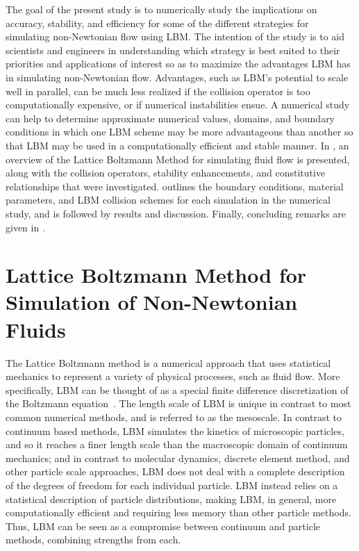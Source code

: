 The goal of the present study is to numerically study the implications on accuracy, stability, and efficiency for some of the different strategies for simulating non-Newtonian flow using LBM. The intention of the study is to aid scientists and engineers in understanding which strategy is best suited to their priorities and applications of interest so as to maximize the advantages LBM has in simulating non-Newtonian flow.
Advantages, such as LBM's potential to scale well in parallel, can be much less realized if the collision operator is too computationally expensive, or if numerical instabilities ensue.
A numerical study can help to determine approximate numerical values, domains, and boundary conditions in which one LBM scheme may be more advantageous than another so that LBM may be used in a computationally efficient and stable manner.
In , an overview of the Lattice Boltzmann Method for simulating fluid flow is presented, along with the collision operators, stability enhancements, and constitutive relationships that were investigated.
 outlines the boundary conditions, material parameters, and LBM collision schemes for each simulation in the numerical study, and is followed by results and discussion.
Finally, concluding remarks are given in .

\section{Lattice Boltzmann Method for Simulation of Non-Newtonian Fluids} \label{sec:LBM}

The Lattice Boltzmann method is a numerical approach that uses statistical mechanics to represent a variety of physical processes, such as fluid flow.
More specifically, LBM can be thought of as a special finite difference discretization of the Boltzmann equation~\cite{chen1998lattice}.
The length scale of LBM is unique in contrast to most common numerical methods, and is referred to as the mesoscale.
In contrast to continuum based methods, LBM simulates the kinetics of microscopic particles, and so it reaches a finer length scale than the macroscopic domain of continuum mechanics; and in contrast to molecular dynamics, discrete element method, and other particle scale approaches, LBM does not deal with a complete description of the degrees of freedom for each individual particle.
LBM instead relies on a statistical description of particle distributions, making LBM, in general, more computationally efficient and requiring less memory than other particle methods.
Thus, LBM can be seen as a compromise between continuum and particle methods, combining strengths from each.

